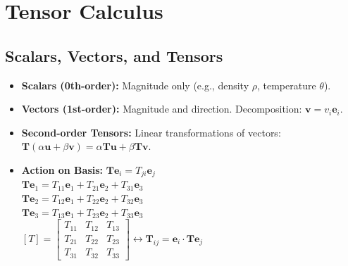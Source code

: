 \documentclass[10pt,twocolumn, a4paper]{article}
\begin{document}
\twocolumn[
  \vspace{0cm}
  {\noindent\large\bfseries Summary of Structural Mechanics Modeling - Part 1 \hfill \small \today}
  \par\vspace{0.2em}\hrule\vspace{0.5em}
]


\section{Tensor Calculus}

\subsection{Scalars, Vectors, and Tensors}
\begin{itemize}
    \item \textbf{Scalars (0th-order):} Magnitude only (e.g., density $\rho$, temperature $\theta$).
    \item \textbf{Vectors (1st-order):} Magnitude and direction. Decomposition: $\bm{v} = v_i \bm{e}_i$.
    \item \textbf{Second-order Tensors:} Linear transformations of vectors: $\bm{T}(\alpha \bm{u} + \beta \bm{v}) = \alpha \bm{T}\bm{u} + \beta \bm{T}\bm{v}$.
    \item \textbf{Action on Basis:} $\bm{T}\bm{e}_i = T_{ji} \bm{e}_j$ \\
    $\bm{T}\bm{e}_1 = T_{11} \bm{e}_1 + T_{21} \bm{e}_2 + T_{31} \bm{e}_3$ \\
    $\bm{T}\bm{e}_2 = T_{12} \bm{e}_1 + T_{22} \bm{e}_2 + T_{32} \bm{e}_3$ \\
    $\bm{T}\bm{e}_3 = T_{13} \bm{e}_1 + T_{23} \bm{e}_2 + T_{33} \bm{e}_3$ \\
    $[T] = \begin{bmatrix} T_{11} & T_{12} & T_{13} \\ T_{21} & T_{22} & T_{23} \\ T_{31} & T_{32} & T_{33} \end{bmatrix} 
    \leftrightarrow \bm{T}_{ij} = \bm{e}_i \cdot \bm{T} \bm{e}_j$
\end{itemize}
\end{document}
